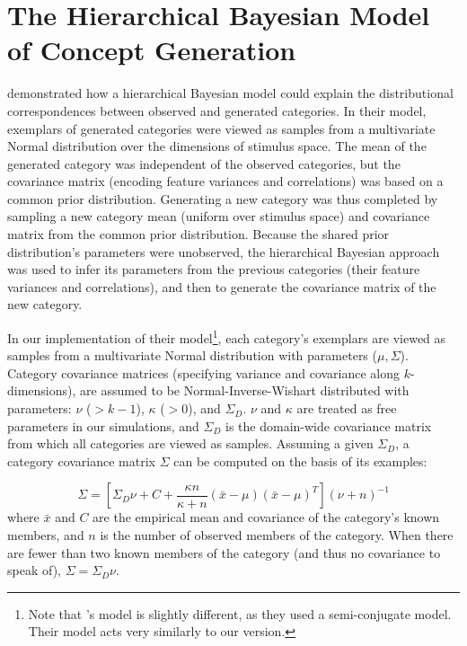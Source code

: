 \documentclass[12pt]{article}
\begin{document}
\clearpage  
\clearpage


\appendix {}

\section{The Hierarchical Bayesian Model of Concept Generation}
\label{ap:hsampling-definition}

\cite{jern2013probabilistic} demonstrated how a hierarchical Bayesian model
could explain the distributional correspondences between observed and generated
categories. In their model, exemplars of generated categories were viewed as
samples from a multivariate Normal distribution over the dimensions of stimulus
space. The mean of the generated category was independent of the observed
categories, but the covariance matrix (encoding feature variances and
correlations) was based on a common prior distribution. Generating a new
category was thus completed by sampling a new category mean (uniform over
stimulus space) and covariance matrix from the common prior distribution.
Because the shared prior distribution's parameters were unobserved, the
hierarchical Bayesian approach was used to infer its parameters from the
previous categories (their feature variances and correlations), and then to
generate the covariance matrix of the new category.

In our implementation of their model\footnote{Note that
\citet{jern2013probabilistic}'s model is slightly different, as they used a
semi-conjugate model. Their model acts very similarly to our version.}, each
category's exemplars are viewed as samples from a multivariate Normal
distribution with parameters ($\mu, \Sigma$). Category covariance matrices
(specifying variance and covariance along $k$-dimensions), are assumed to be
Normal-Inverse-Wishart distributed with parameters: $\nu$ ($>k-1$), $\kappa$
($>0$), and $\Sigma_D$. $\nu$ and $\kappa$ are treated as free parameters in our
simulations, and $\Sigma_D$ is the domain-wide covariance matrix from which all
categories are viewed as samples. Assuming a given $\Sigma_D$, a category
covariance matrix $\Sigma$ can be computed on the basis of its examples:

\begin{equation} \Sigma = \left[ \Sigma_D \nu + C + \dfrac {\kappa n} {\kappa +
n} (\bar{x}-\mu)(\bar{x}-\mu)^T \right] (\nu + n)^{-1}
\label{eq:Sigma_B}
\end{equation}
% 
where $\bar{x}$ and $C$ are the empirical mean and covariance of the category's
known members, and $n$ is the number of observed members of the category. When
there are fewer than two known members of the category (and thus no covariance
to speak of), $\Sigma = \Sigma_D\nu$.
\end{document}
